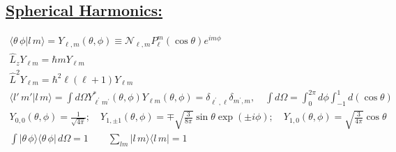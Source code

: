 \documentclass[a4paper,12pt]{article}
\begin{document}
\subsection*{\underline{Spherical Harmonics:}}
\begin{gather}
    \langle \theta\, \phi | l \,m \rangle = Y_{\ell, m}(\theta, \phi) \equiv \mathcal{N}_{\ell, m} P_{\ell}^{m}(\cos \theta) e^{i m \phi}\\
    \hat{L}_{z} Y_{\ell m}=\hbar m Y_{\ell m}\\
    \hat{L}^{2} Y_{\ell m}=\hbar^{2} \ell(\ell+1) Y_{\ell m}\\
    \langle l' \,m' | l \,m \rangle = \int d \Omega Y_{\ell^{\prime} m^{\prime}}^{*}(\theta, \phi) Y_{\ell m}(\theta, \phi)=\delta_{\ell^{\prime}, \ell} \delta_{m^{\prime}, m}, \quad \int d \Omega=\int_{0}^{2 \pi} d \phi \int_{-1}^{1} d(\cos \theta)\\
    Y_{0,0}(\theta, \phi)=\frac{1}{\sqrt{4 \pi}} ; \quad Y_{1, \pm 1}(\theta, \phi)=\mp \sqrt{\frac{3}{8 \pi}} \sin \theta \exp (\pm i \phi) ; \quad Y_{1,0}(\theta, \phi)=\sqrt{\frac{3}{4 \pi}} \cos \theta \\
    \int |\theta \, \phi \rangle \langle \theta \, \phi | \, d\Omega = 1 \qquad \sum_{lm} | l \, m \rangle \langle l \, m | = 1
\end{gather}
\end{document}
